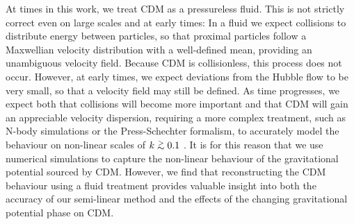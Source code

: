\documentclass[twocolumn,superscriptaddress,prd]{revtex4}
\def\gtsima{$\; \buildrel > \over \sim \;$}
\def\gsim{\lower.5ex\hbox{\gtsima}}
\begin{document}
At times in this work, we treat CDM as a pressureless fluid.  This is not
strictly correct even on large scales and at early times: In a fluid we expect collisions 
to distribute energy between particles,
so that proximal particles follow a Maxwellian velocity distribution
with a well-defined mean, providing an unambiguous velocity field.  
Because CDM is collisionless, 
this process does not occur.  However, at
early times, we expect deviations from the Hubble flow to be very
small, so that a velocity field may still be defined.  As time
progresses, we expect both that collisions will become more important
and that CDM will gain an appreciable
velocity dispersion, requiring a more complex treatment, such as
N-body simulations or the Press-Schechter formalism, to accurately model
the behaviour on non-linear scales of $k \gsim 0.1$
\citep{press74,msII,schneider}.  
It is for this reason that we 
use numerical simulations to capture the non-linear behaviour of the
gravitational potential sourced by CDM.  However, we find
that reconstructing the CDM behaviour using a fluid treatment
provides valuable insight into both the accuracy of our
semi-linear method and the effects of the changing gravitational
potential phase on CDM.



\end{document}
